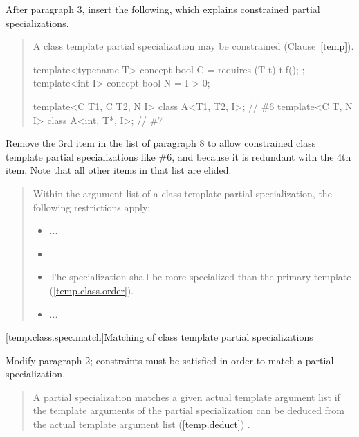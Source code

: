 After paragraph 3, insert the following, which explains constrained partial 
specializations.

\begin{quote}
\begin{addedblock}
\setcounter{Paras}{3}
\pnum
A class template partial specialization may be constrained
(Clause~\ref{temp}).
\enterexample
\begin{codeblock}
template<typename T> concept bool C = requires (T t) { t.f(); };
template<int I> concept bool N = I > 0;

template<C T1, C T2, N I> class A<T1, T2, I>;  // \#6
template<C T, N I>        class A<int, T*, I>; // \#7
\end{codeblock}
\exitexample
\end{addedblock}
\end{quote}

Remove the 3rd item in the list of paragraph 8 to allow constrained class 
template partial specializations like \#6, and because it is redundant with 
the 4th item. Note that all other items in that list are elided.

\begin{quote}
\setcounter{Paras}{7}
\pnum
Within the argument list of a class template partial specialization, 
the following restrictions apply:
\begin{itemize}
\item ...

\item {}

\item The specialization shall be more specialized than the primary
template (\ref{temp.class.order}).

\item ...
\end{itemize}
\end{quote}
 
[temp.class.spec.match]{Matching of class template partial specializations}

Modify paragraph 2; constraints must be satisfied in order
to match a partial specialization. 

\begin{quote}
\setcounter{Paras}{1}
\pnum
A partial specialization matches a given actual template argument list if 
the template arguments of the partial specialization can be deduced from the 
actual template argument list (\ref{temp.deduct}) .
\end{quote}

